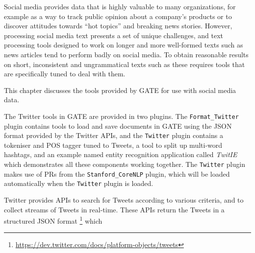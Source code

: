 %
%
%


\nnormalsize

Social media provides data that is highly valuable to many organizations, for
example as a way to track public opinion about a company's products or to
discover attitudes towards ``hot topics'' and breaking news stories.  However,
processing social media text presents a set of unique challenges, and text
processing tools designed to work on longer and more well-formed texts such as
news articles tend to perform badly on social media.  To obtain reasonable
results on short, inconsistent and ungrammatical texts such as these requires
tools that are specifically tuned to deal with them.

This chapter discusses the tools provided by GATE for use with social media
data.


The Twitter tools in GATE are provided in two plugins.  The
\verb!Format_Twitter! plugin contains tools to load and save documents in GATE
using the JSON format provided by the Twitter APIs, and the \verb!Twitter!
plugin contains a tokeniser and POS tagger tuned to Tweets, a tool to split
up multi-word hashtags, and an example named entity recognition application
called {\em TwitIE} which demonstrates all these components working together.
The \verb!Twitter! plugin makes use of PRs from the \verb!Stanford_CoreNLP!
plugin, which will be loaded automatically when the \verb!Twitter! plugin is
loaded.

%
Twitter provides APIs to search for Tweets according to various criteria, and
to collect streams of Tweets in real-time.  These APIs return the Tweets in a
structured JSON format%
\footnote{\url{https://dev.twitter.com/docs/platform-objects/tweets}} which


